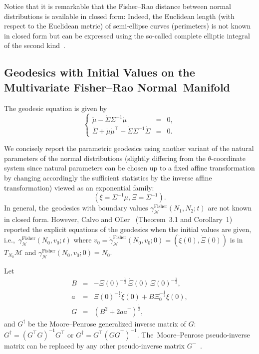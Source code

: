 \documentclass[entropy,article,accept,oneauthor,pdftex,entropy]{Definitions/mdpi}
\def\calM{\mathcal{M}}
\def\Fisher{\mathrm{Fisher}}
\def\calN{\mathcal{N}}
\begin{document}
Notice that it is remarkable that the Fisher--Rao distance between normal distributions is available in closed form:
Indeed, the Euclidean length (with respect to the Euclidean metric) of semi-ellipse curves (perimeters) is not known in closed form but can be expressed using the so-called complete elliptic integral of the second kind~\cite{chandrupatla2010perimeter}.

 

\subsection{Geodesics with Initial Values on the Multivariate Fisher--Rao Normal~Manifold}
The geodesic equation is given by
$$
\left\{ \begin{array}{lcl}
\ddot\mu-\dot\Sigma\Sigma^{-1}\dot\mu &=& 0,\\
\ddot\Sigma+\dot\mu\dot\mu^\top-\dot\Sigma\Sigma^{-1}\dot\Sigma &=& 0.
\end{array}
\right.
$$

We concisely report the parametric geodesics using another variant of the natural parameters of the normal distributions (slightly differing from the $\theta$-coordinate system since natural parameters can be chosen up to a fixed affine transformation by changing accordingly the sufficient statistics by the inverse affine transformation) viewed as an exponential family:
$$
\left(\xi=\Sigma^{-1}\mu,\Xi=\Sigma^{-1}\right).
$$
In general, the~geodesics with boundary values $\gamma_\calN^\Fisher(N_1,N_2;t)$ are not known in closed form.
However, Calvo and Oller~\cite{calvo1991explicit} (Theorem~3.1 and Corollary~1) reported the explicit equations of the geodesics when the initial values are given, i.e.,~$\gamma_\calN^\Fisher(N_0,v_0;t)$ where $v_0=\dot\gamma_\calN^\Fisher(N_0,v_0;0)=(\dot\xi(0),\dot\Xi(0))$ is in $T_{N_0}\calM$ and $\gamma_\calN^\Fisher(N_0,v_0;0)=N_0$.


Let 
\begin{eqnarray*}
B &=& -\Xi(0)^{-\frac{1}{2}}\, \dot\Xi(0)\, \Xi(0)^{-\frac{1}{2}},\\
a &=& \Xi(0)^{-\frac{1}{2}}\dot\xi(0)+B\Xi_0^{-\frac{1}{2}}\xi(0),\\
G &=& (B^2+2aa^\top)^{\frac{1}{2}},
\end{eqnarray*}
and $G^\dagger$ be the Moore–Penrose generalized inverse matrix of $G$: $G^\dagger=(G^\top G)^{-1}G^\top$ or $G^\dagger=G^\top(G G^\top)^{-1}$. The~Moore–Penrose pseudo-inverse matrix can be replaced by any other pseudo-inverse matrix $G^-$~\cite{calvo1991explicit}.
\end{document}

